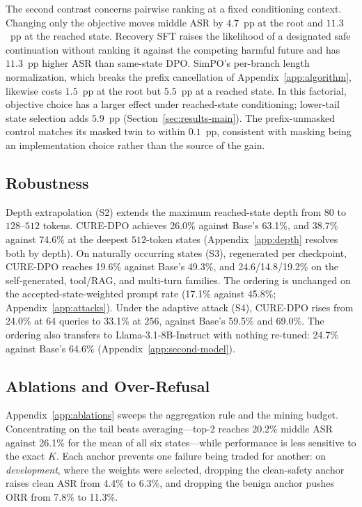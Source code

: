 \documentclass[11pt]{article}
\newcommand{\method}{CURE-DPO}
\newcommand{\asr}{ASR}
\newcommand{\orr}{ORR}
\begin{document}
The second contrast concerns pairwise ranking at a fixed conditioning context.
Changing only the objective moves middle \asr{} by \(4.7\)~pp at the root and
\(11.3\)~pp at the reached state. Recovery SFT raises the likelihood of a
designated safe continuation without ranking it against the competing harmful
future and has \(11.3\)~pp higher \asr{} than same-state DPO. SimPO's per-branch
length normalization, which breaks the prefix cancellation
of Appendix~\ref{app:algorithm}, likewise costs \(1.5\)~pp at the root but
\(5.5\)~pp at a reached state. In this factorial, objective choice has a larger
effect under reached-state conditioning; lower-tail state selection adds
\(5.9\)~pp (Section~\ref{sec:results-main}). The prefix-unmasked control matches
its masked twin to within \(0.1\)~pp, consistent with masking being an
implementation choice rather than the source of the gain.


\subsection{Robustness}
\label{sec:results-robustness}

Depth extrapolation (S2) extends the maximum reached-state depth from \(80\) to
\(128\)--\(512\) tokens. \method{} achieves 26.0\% against Base's 63.1\%, and
38.7\% against 74.6\% at the
deepest \(512\)-token states (Appendix~\ref{app:depth} resolves both by depth).
On naturally occurring states (S3), regenerated per checkpoint, \method{}
reaches 19.6\% against Base's 49.3\%, and 24.6/14.8/19.2\% on the self-generated,
tool/RAG, and multi-turn families. The ordering is unchanged on the
accepted-state-weighted prompt rate (17.1\% against 45.8\%;
Appendix~\ref{app:attacks}). Under the adaptive attack (S4), \method{} rises
from 24.0\%
at \(64\) queries to 33.1\% at \(256\), against Base's 59.5\% and 69.0\%.
The ordering also transfers to Llama-3.1-8B-Instruct with nothing re-tuned:
24.7\% against Base's 64.6\% (Appendix~\ref{app:second-model}).

\subsection{Ablations and Over-Refusal}
\label{sec:results-ablations}

Appendix~\ref{app:ablations} sweeps the aggregation rule and the mining budget.
Concentrating on the tail beats averaging---top-2 reaches 20.2\% middle \asr{}
against 26.1\% for the mean of all six states---while performance is less
sensitive to the exact \(K\). Each anchor prevents one failure being traded for
another: on \emph{development}, where the weights were selected, dropping the
clean-safety anchor raises clean \asr{} from 4.4\% to 6.3\%, and dropping the
benign anchor pushes \orr{} from 7.8\% to 11.3\%.
\end{document}
